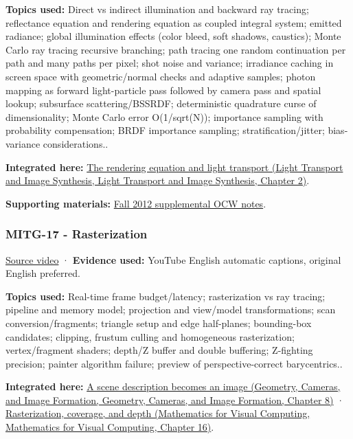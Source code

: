 \textbf{Topics used:} Direct vs indirect illumination and backward ray tracing; reflectance equation and rendering equation as coupled integral system; emitted radiance; global illumination effects (color bleed, soft shadows, caustics); Monte Carlo ray tracing recursive branching; path tracing one random continuation per path and many paths per pixel; shot noise and variance; irradiance caching in screen space with geometric/normal checks and adaptive samples; photon mapping as forward light-particle pass followed by camera pass and spatial lookup; subsurface scattering/BSSRDF; deterministic quadrature curse of dimensionality; Monte Carlo error O(1/sqrt(N)); importance sampling with probability compensation; BRDF importance sampling; stratification/jitter; bias-variance considerations..

\textbf{Integrated here:} \href{../04-Light-Transport-and-Image-Synthesis/main.pdf\#nameddest=03-visual-computing-i-ch007-the-rendering-equation-and-light-transport}{The rendering equation and light transport (Light Transport and Image Synthesis, Light Transport and Image Synthesis, Chapter 2)}.

\textbf{Supporting materials:} \href{https://ocw.mit.edu/courses/6-837-computer-graphics-fall-2012/pages/lecture-notes/}{Fall 2012 supplemental OCW notes}.

\subsubsection{MITG-17 - Rasterization}\label{04-visual-computing-ii-ch036-mitg-17---rasterization}

\href{https://www.youtube.com/watch?v=aCTEiX59ERM}{Source video} · \textbf{Evidence used:} YouTube English automatic captions, original English preferred.

\textbf{Topics used:} Real-time frame budget/latency; rasterization vs ray tracing; pipeline and memory model; projection and view/model transformations; scan conversion/fragments; triangle setup and edge half-planes; bounding-box candidates; clipping, frustum culling and homogeneous rasterization; vertex/fragment shaders; depth/Z buffer and double buffering; Z-fighting precision; painter algorithm failure; preview of perspective-correct barycentrics..

\textbf{Integrated here:} \href{../03-Geometry-Cameras-and-Image-Formation/main.pdf\#nameddest=03-visual-computing-i-ch001-a-scene-description-becomes-an-image}{A scene description becomes an image (Geometry, Cameras, and Image Formation, Geometry, Cameras, and Image Formation, Chapter 8)} · \href{../02-Mathematics-for-Visual-Computing/main.pdf\#nameddest=03-visual-computing-i-ch012-rasterization-coverage-and-depth}{Rasterization, coverage, and depth (Mathematics for Visual Computing, Mathematics for Visual Computing, Chapter 16)}.

